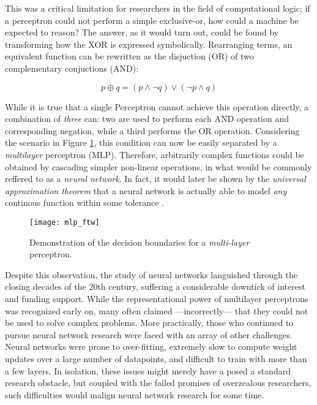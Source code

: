 This was a critical limitation for researchers in the field of computational logic; if a perceptron could not perform a simple exclusive-or, how could a machine be expected to reason?
The answer, as it would turn out, could be found by transforming how the XOR is expressed symbolically.
Rearranging terms, an equivalent function can be rewritten as the disjuction (OR) of two complementary conjuctions (AND):

\begin{equation}
\label{eq:xor}
p \oplus q = (p \wedge \neg q) \vee (\neg p \wedge q)
\end{equation}

\noindent While it is true that a single Perceptron cannot achieve this operation directly, a combination of \emph{three} can: two are used to perform each AND operation and corresponding negation, while a third performs the OR operation.
Considering the scenario in Figure \ref{fig:mlp_ftw}, this condition can now be easily separated by a \emph{multilayer} perceptron (MLP).
Therefore, arbitrarily complex functions could be obtained by cascading simpler non-linear operations, in what would be commonly reffered to as a \emph{neural network}.
In fact, it would later be shown by the \emph{universal approximation theorem} that a neural network is actually able to model \emph{any} continous function within some tolerance \cite{Cybenko1989, Hornik1991}.

\begin{figure}
\begin{centering}
\texttt{[image: mlp\_ftw]}
\caption{Demonstration of the decision boundaries for a \emph{multi-layer} perceptron.}
\label{fig:mlp_ftw}
\end{centering}
\end{figure}

Despite this observation, the study of neural networks languished through the closing decades of the 20th century, suffering a considerable downtick of interest and funding support.
While the representational power of multilayer perceptrons was recognized early on, many often claimed ---incorrectly--- that they could not be used to solve complex problems.
More practically, those who continued to pursue neural network research were faced with an array of other challenges.
Neural networks were prone to over-fitting, extremely slow to compute weight updates over a large number of datapoints, and difficult to train with more than a few layers.
In isolation, these issues might merely have a posed a standard research obstacle, but coupled with the failed promises of overzealous researchers, such difficulties would malign neural network research for some time.


